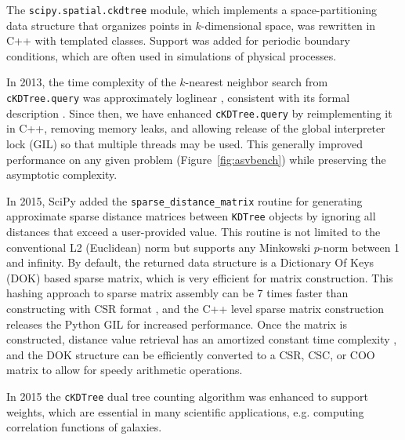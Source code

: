 The \texttt{scipy.spatial.ckdtree} module, which implements a space-partitioning data structure that
organizes points in $k$-dimensional space, was rewritten in C++ with templated classes.
Support was added for periodic boundary conditions, which are often used
in simulations of physical processes.

In 2013, the time complexity of the $k$-nearest neighbor search from
\texttt{cKDTree.query} was approximately loglinear \cite{knn-jake},
consistent with its formal description \cite{kdtree-search-algo}.
Since then, we have enhanced \texttt{cKDTree.query} by reimplementing it in
C++, removing memory leaks, and allowing release of the global interpreter lock (GIL) so that
multiple threads may be used\cite{gh-4374}. This generally improved
performance on any given problem (Figure~\ref{fig:asvbench})
while preserving the asymptotic complexity.

In 2015, SciPy added the \texttt{sparse\_distance\_matrix} routine for generating
approximate sparse distance matrices between \texttt{KDTree} objects by ignoring
all distances that exceed a user-provided value. This routine is not
limited to the conventional L2 (Euclidean) norm but supports any Minkowski
$p$-norm between 1 and infinity. By default, the returned data structure is a
Dictionary Of Keys (DOK) based sparse matrix, which is very efficient for matrix
construction. This hashing approach to sparse matrix assembly can be 7 times
faster than constructing with CSR format
\cite{10.1007/978-3-540-75755-9_107}, and the C++ level sparse matrix construction
releases the Python GIL for increased performance. Once the matrix is constructed,
distance value retrieval has an amortized constant time complexity
\cite{Cormen:2001:IA:580470}, and the DOK structure can be efficiently converted
to a CSR, CSC, or COO matrix to allow for
speedy arithmetic operations.

In 2015 the \texttt{cKDTree} dual tree counting algorithm\cite{Moore2000ar}
was enhanced to support weights\cite{ckdtree-weights}, which are
essential in many scientific applications, e.g. computing correlation
functions of galaxies\cite{0004-637X-750-1-38}.
